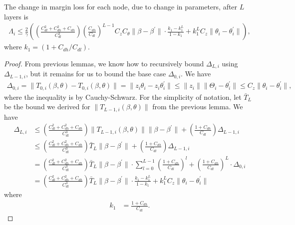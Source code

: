 \begin{lemma}
    The change in margin loss for each node, due to change in parameters, after $L$ layers is 
    \begin{align*}
        \Lambda_i \leq \frac{2}{\gamma} \left(\left(
        \frac{C_{dl}^2 + C_{dh}^2 + C_{dh}}{C_{dl}^3}
        \right)\left(\frac{C_{dh}}{C_{dl}}\right)^{L-1} C_z C_\theta \|\beta - \beta^\prime\| \cdot \frac{k_1 - k_1^L}{1-k_1} + k_1^L C_z \|\theta_i - \theta_i^\prime\|\right), 
    \end{align*}
    where $k_1 = (1+C_{dh}/C_{dl})$.
\end{lemma}
\begin{proof}
    From previous lemmas, we know how to recursively bound $\Delta_{L,i}$ using $\Delta_{L-1, i}$, but it remains for us to bound the base case $\Delta_{0, i}$. We have
    \begin{align*}
        \Delta_{0, i} 
        = \|T_{0, i}(\beta, \theta) - T_{0, i}(\beta, \theta)\|
        = \|z_i\theta_i - z_i\theta_i^\prime\|
        \leq \|z_i\| \|\Theta_i - \theta_i^\prime\| \leq C_z \|\theta_i - \theta_i^\prime\|,
    \end{align*}
    where the inequality is by Cauchy-Schwarz.
    For the simplicity of notation, let $\bar T_L$ be the bound we derived for $\|T_{L-1, i}(\beta, \theta)\|$ from the previous lemma. We have
    \begin{align*}
        \Delta_{L, i} 
        &\leq \left(
        \frac{C_{dl}^2 + C_{dh}^2 + C_{dh}}{C_{dl}^3}
        \right)\|T_{L-1, i}(\beta, \theta)\| \|\beta - \beta^\prime\| + \left(\frac{1 + C_{dh}}{C_{dl}}\right)\Delta_{L-1, i}\\
        &\leq \left(
        \frac{C_{dl}^2 + C_{dh}^2 + C_{dh}}{C_{dl}^3}
        \right)\bar T_{L} \|\beta - \beta^\prime\| + \left(\frac{1 + C_{dh}}{C_{dl}}\right)\Delta_{L-1, i}\\
        &= \left(
        \frac{C_{dl}^2 + C_{dh}^2 + C_{dh}}{C_{dl}^3}
        \right)\bar T_{L} \|\beta - \beta^\prime\| \cdot \sum_{l=0}^{L-1} \left(\frac{1 + C_{dh}}{C_{dl}}\right)^l + \left(\frac{1 + C_{dh}}{C_{dl}}\right)^L \cdot \Delta_{0, i}
        \tag{by recursively bounding the terms}\\
        &= \left(
        \frac{C_{dl}^2 + C_{dh}^2 + C_{dh}}{C_{dl}^3}
        \right)\bar T_{L} \|\beta - \beta^\prime\| \cdot \frac{k_1 - k_1^L}{1-k_1} + k_1^L C_z \|\theta_i - \theta_i^\prime\| 
    \end{align*}
    where 
    \begin{align*}
        k_1 &= \frac{1 + C_{dh}}{C_{dl}}.
    \end{align*}


\end{proof}

